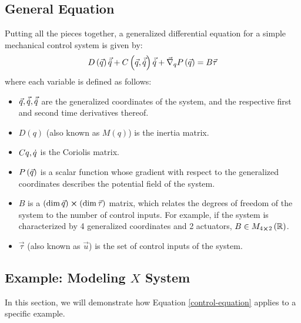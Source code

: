 \documentclass[main.tex]{subfiles}
\begin{document}
\subsection{General Equation}
Putting all the pieces together, a generalized differential equation for a simple mechanical control system is given by:
\begin{align}
    D\del{\vec q}\vec\qdd+C\del{\vec q,\vec\qd}\vec\qd+\vec\nabla_qP\del{\vec q}=B\vec\tau\label{control-equation}
\end{align}
where each variable is defined as follows:
\begin{itemize}
    \item $\vec q, \vec {\dot q}, \vec {\ddot q}$ are the generalized coordinates of the system, and the respective first and second time derivatives thereof.
    \item $D(q)$ (also known as $M(q)$) is the inertia matrix.
    \item $C{q,\dot q}$ is the Coriolis matrix.
    \item $P\del{\vec q}$ is a scalar function whose gradient with respect to the generalized coordinates describes the potential field of the system.
    \item $B$ is a $\del{\dim \vec q }\cross\del{ \dim \vec\tau}$ matrix, which relates the degrees of freedom of the system to the number of control inputs. For example, if the system is characterized by 4 generalized coordinates and 2 actuators, $B\in M_{4\cross 2}\del{\ree}$.
    \item $\vec \tau$ (also known as $\vec u$) is the set of control inputs of the system.
\end{itemize}
\subsection{Example: Modeling $X$ System}
In this section, we will demonstrate how Equation \ref{control-equation} applies to a specific example.
\end{document}
